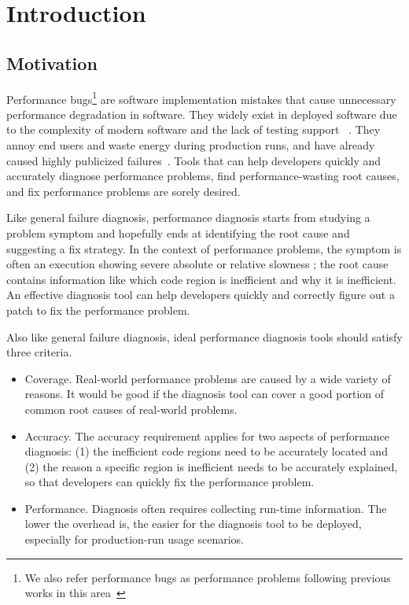 \section{Introduction}
\label{sec:intro}
\subsection{Motivation}

Performance bugs\footnote{We also refer performance bugs as performance problems
following previous works in this area~\citep{PerfBug,Alabama,SongOOPSLA2014}} 
are software implementation mistakes that cause unnecessary performance
degradation in software. They widely exist in deployed software due to the 
complexity of modern software and the lack of testing support
~\citep{s2e,PerfBug,perf.fse10,rily.perftest,perfantipattern,xiao13:context}. 
They annoy end users and waste energy during production runs, and 
have already caused highly publicized failures~\citep{ACA-health,colorado}.
Tools that can help
developers quickly and accurately diagnose performance problems,
find performance-wasting root causes, and fix performance problems
are sorely desired. 

Like general failure diagnosis, 
performance diagnosis starts from studying a problem symptom and hopefully ends
at identifying the root cause and suggesting a fix strategy. 
In the context of performance problems,
the symptom is often
an execution showing severe absolute or
relative slowness \citep{SongOOPSLA2014}; the root cause contains 
information like which code region is inefficient and why
it is inefficient. An effective diagnosis tool can help developers quickly
and correctly figure out a patch to fix the performance problem.

Also like general failure diagnosis, ideal performance diagnosis tools should
satisfy three criteria.
\begin{itemize}
\item Coverage. 
Real-world performance problems are caused by a wide variety of reasons. It 
would be good if the diagnosis tool can cover a good portion of common
root causes of real-world problems.

\item Accuracy. 
The accuracy requirement applies for two aspects of performance diagnosis: (1)
the inefficient code regions need to be accurately located and (2)
the reason a specific region is inefficient needs to be accurately
explained, so that developers can quickly fix the performance problem.

\item Performance. 
Diagnosis often requires collecting run-time information. The lower the overhead
is, the easier for the diagnosis tool to be deployed, especially for 
production-run usage scenarios. 
\end{itemize}


